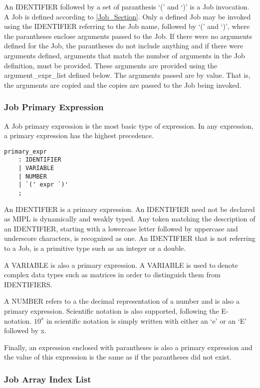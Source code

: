 \documentclass[prodmode,acmtecs]{acmsmall}
\begin{document}
An IDENTIFIER followed by a set of paranthesis `(' and `)' is a Job
invocation. A Job is defined according to \ref{Job_Section}. Only a defined
Job may be invoked using the IDENTIFIER referring to the Job name,
followed by `(' and `)', where the parantheses enclose arguments passed
to the Job. If there were no arguments defined for the Job, the
parantheses do not include anything and if there were arguments defined, 
arguments that match the number of arguments in the Job definition, must
be provided. These arguments are provided using the argument\_expr\_list 
defined below. The arguments passed are by value. That is, the arguments 
are copied and the copies are passed to the Job being invoked.
\medskip

\subsubsection{Job Primary Expression}

A Job primary expression is the most basic type of expression. In any
expression, a primary expression has the highest precedence.

\begin{lstlisting}
primary_expr
	: IDENTIFIER
	| VARIABLE
	| NUMBER
	| `(' expr `)'
	;
\end{lstlisting}

An IDENTIFIER is a primary expression. An IDENTIFIER need not be declared
as MIPL is dynamically and weakly typed. Any token matching the description
of an IDENTIFIER, starting with a lowercase letter followed by uppercase and
underscore characters, is recognized as one. An IDENTIFIER that is not 
referring to a Job, is a primitive type such as an integer or a double.

A VARIABLE is also a primary expression. A VARIABLE is used to denote complex 
data types such as matrices in order to distinguish them from IDENTIFIERS.

A NUMBER refers to a the decimal representation of a number and is also a 
primary expression. Scientific notation is also supported, following the 
E-notation. $10^{x}$ in scientific notation is simply written with either an
`e' or an `E' followed by x.

Finally, an expression enclosed with parantheses is also a primary expression 
and the value of this expression is the same as if the parantheses did not 
exist.
\medskip

\subsubsection{Job Array Index List}
\end{document}
